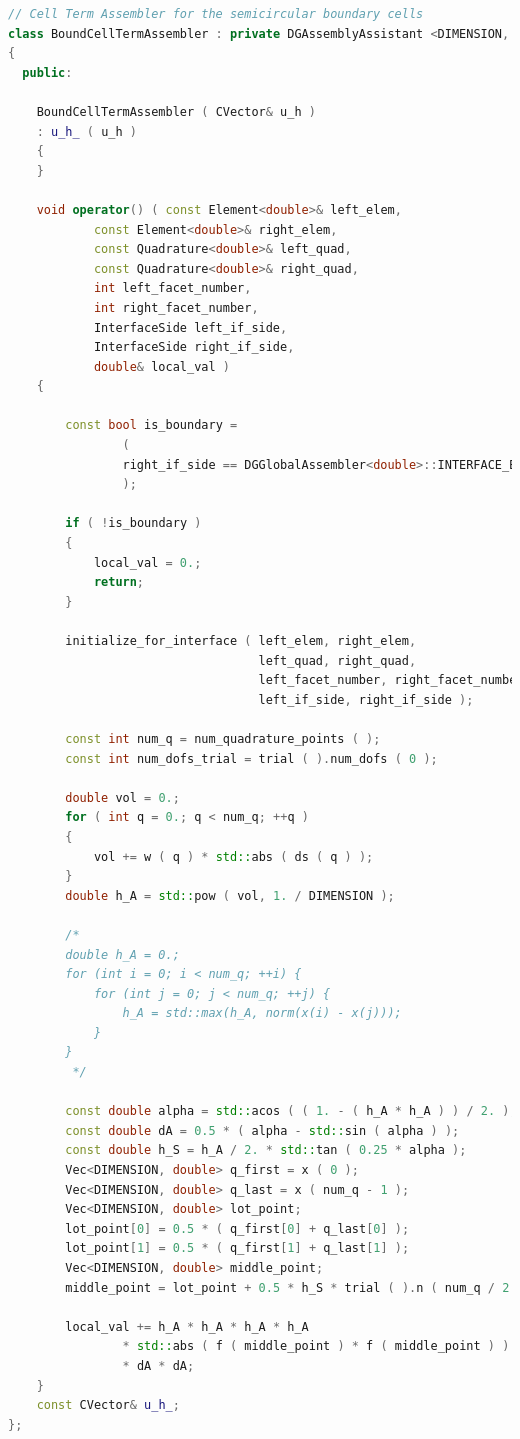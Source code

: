 \documentclass[a4paper, 11pt, twoside]{article}
\begin{document}
\begin{lstlisting}[language=C++, basicstyle={\footnotesize, \ttfamily}, keywordstyle=\color{blue}, numbers=none, tabsize=4]
// Cell Term Assembler for the semicircular boundary cells
class BoundCellTermAssembler : private DGAssemblyAssistant <DIMENSION, double>
{
  public:

    BoundCellTermAssembler ( CVector& u_h )
    : u_h_ ( u_h )
    {
    }

    void operator() ( const Element<double>& left_elem,
            const Element<double>& right_elem,
            const Quadrature<double>& left_quad,
            const Quadrature<double>& right_quad,
            int left_facet_number,
            int right_facet_number,
            InterfaceSide left_if_side,
            InterfaceSide right_if_side,
            double& local_val )
    {

        const bool is_boundary =
                (
                right_if_side == DGGlobalAssembler<double>::INTERFACE_BOUNDARY
                );

        if ( !is_boundary )
        {
            local_val = 0.;
            return;
        }

        initialize_for_interface ( left_elem, right_elem,
                                   left_quad, right_quad,
                                   left_facet_number, right_facet_number,
                                   left_if_side, right_if_side );

        const int num_q = num_quadrature_points ( );
        const int num_dofs_trial = trial ( ).num_dofs ( 0 );

        double vol = 0.;
        for ( int q = 0.; q < num_q; ++q )
        {
            vol += w ( q ) * std::abs ( ds ( q ) );
        }
        double h_A = std::pow ( vol, 1. / DIMENSION );

        /*
        double h_A = 0.;
        for (int i = 0; i < num_q; ++i) {
            for (int j = 0; j < num_q; ++j) {
                h_A = std::max(h_A, norm(x(i) - x(j)));
            }
        }
         */

        const double alpha = std::acos ( ( 1. - ( h_A * h_A ) ) / 2. );
        const double dA = 0.5 * ( alpha - std::sin ( alpha ) );
        const double h_S = h_A / 2. * std::tan ( 0.25 * alpha );
        Vec<DIMENSION, double> q_first = x ( 0 );
        Vec<DIMENSION, double> q_last = x ( num_q - 1 );
        Vec<DIMENSION, double> lot_point;
        lot_point[0] = 0.5 * ( q_first[0] + q_last[0] );
        lot_point[1] = 0.5 * ( q_first[1] + q_last[1] );
        Vec<DIMENSION, double> middle_point;
        middle_point = lot_point + 0.5 * h_S * trial ( ).n ( num_q / 2 );

        local_val += h_A * h_A * h_A * h_A
                * std::abs ( f ( middle_point ) * f ( middle_point ) )
                * dA * dA;
    }
    const CVector& u_h_;
};

\end{lstlisting}
\end{document}
